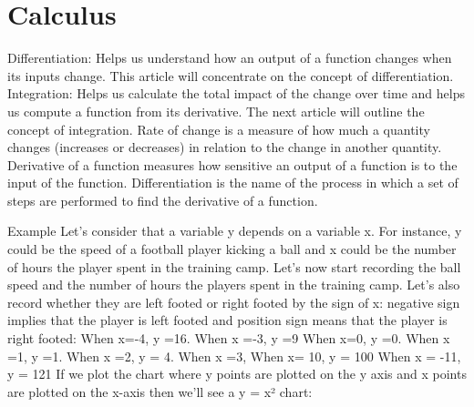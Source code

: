 \chapter{Calculus}

Differentiation: Helps us understand how an output of a function changes when its inputs change. This article will concentrate on the concept of differentiation.
Integration: Helps us calculate the total impact of the change over time and helps us compute a function from its derivative. The next article will outline the concept of integration.
Rate of change is a measure of how much a quantity changes (increases or decreases) in relation to the change in another quantity.
Derivative of a function measures how sensitive an output of a function is to the input of the function. Differentiation is the name of the process in which a set of steps are performed to find the derivative of a function.

Example
Let’s consider that a variable y depends on a variable x. For instance, y could be the speed of a football player kicking a ball and x could be the number of hours the player spent in the training camp.
Let’s now start recording the ball speed and the number of hours the players spent in the training camp. Let’s also record whether they are left footed or right footed by the sign of x: negative sign implies that the player is left footed and position sign means that the player is right footed:
When x=-4, y =16.
When x =-3, y =9
When x=0, y =0.
When x =1, y =1.
When x =2, y = 4.
When x =3,
When x= 10, y = 100
When x = -11, y = 121
If we plot the chart where y points are plotted on the y axis and x points are plotted on the x-axis then we’ll see a y = x² chart:

